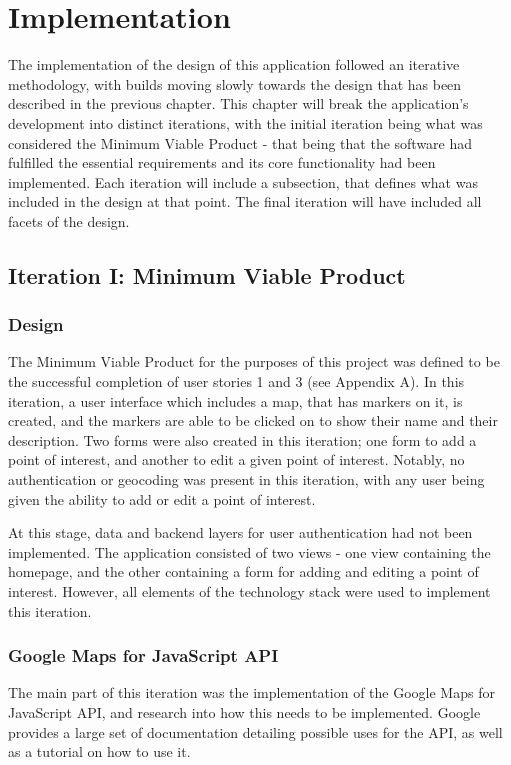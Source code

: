 \chapter{Implementation}

The implementation of the design of this application followed an iterative methodology, with builds moving slowly towards the design that has been described in the previous chapter. This chapter will break the application's development into distinct iterations, with the initial iteration being what was considered the Minimum Viable Product - that being that the software had fulfilled the essential requirements and its core functionality had been implemented. Each iteration will include a subsection, that defines what was included in the design at that point. The final iteration will have included all facets of the design.

\section{Iteration I: Minimum Viable Product}
\subsection{Design}
The Minimum Viable Product for the purposes of this project was defined to be the successful completion of user stories 1 and 3 (see Appendix A). In this iteration, a user interface which includes a map, that has markers on it, is created, and the markers are able to be clicked on to show their name and their description. Two forms were also created in this iteration; one form to add a point of interest, and another to edit a given point of interest. Notably, no authentication or geocoding was present in this iteration, with any user being given the ability to add or edit a point of interest.

At this stage, data and backend layers for user authentication had not been implemented. The application consisted of two views - one view containing the homepage, and the other containing a form for adding and editing a point of interest. However, all elements of the technology stack were used to implement this iteration.
\newpage


\subsection{Google Maps for JavaScript API}

The main part of this iteration was the implementation of the Google Maps for JavaScript API, and research into how this needs to be implemented. Google provides a large set of documentation detailing possible uses for the API, as well as a tutorial on how to use it.


